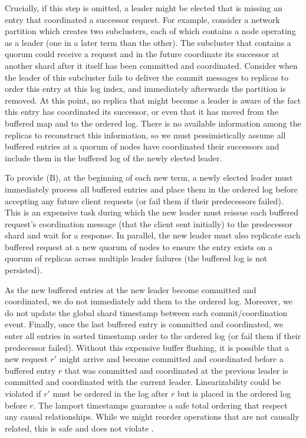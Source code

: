 Crucially, if this step is omitted, a leader might be elected that is missing an entry that coordinated a successor request. For example, consider a network partition which creates two subclusters, each of which contains a node operating as a leader (one in a later term than the other). The subcluster that contains a quorum could receive a request and in the future coordinate its successor at another shard after it itself has been committed and coordinated. Consider when the leader of this subcluster fails to deliver the commit messages to replicas to order this entry at this log index, and immediately afterwards the partition is removed. At this point, no replica that might become a leader is aware of the fact this entry has coordinated its successor, or even that it has moved from the buffered map and to the ordered log. There is no available information among the replicas to reconstruct this information, so we must pessimistically assume all buffered entries at a quorum of nodes have coordinated their successors and include them in the buffered log of the newly elected leader.

To provide (B), at the beginning of each new term, a newly elected leader must immediately process all buffered entries and place them in the ordered log before accepting any future client requests (or fail them if their predecessors failed). This is an expensive task during which the new leader must reissue each buffered request's coordination message (that the client sent initially) to the predecessor shard and wait for a response. In parallel, the new leader must also replicate each buffered request at a new quorum of nodes to ensure the entry exists on a quorum of replicas across multiple leader failures (the buffered log is not persisted).


As the new buffered entries at the new leader become committed and coordinated, we do not immediately add them to the ordered log. Moreover, we do not update the global shard timestamp between each commit/coordination event. Finally, once the last buffered entry is committed and coordinated, we enter all entries in sorted timestamp order to the ordered log (or fail them if their predecessor failed). Without this expensive buffer flushing, it is possible that a new request $r'$ might arrive and become committed and coordinated before a buffered entry $r$ that was committed and coordinated at the previous leader is committed and coordinated with the current leader. Linearizability could be violated if $r'$ must be ordered in the log after $r$ but is placed in the ordered log before $r$. The lamport timestamps guarantee a safe total ordering that respect any causal relationships. While we might reorder operations that are not causally related, this is safe and does not violate \mdl. 

